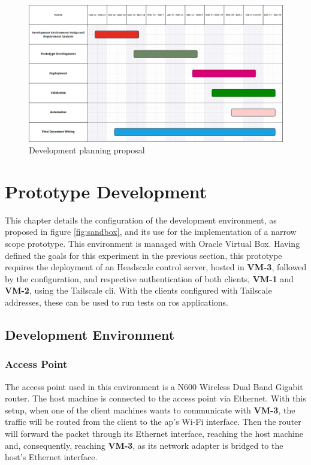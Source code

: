 \documentclass[11pt,twoside,a4paper]{report}
\begin{document}
\begin{figure}[h]
\centering
\includegraphics[width=1\textwidth]{gantt.png}
\caption{Development planning proposal}
\label{fig:gantt}
\end{figure}

\chapter{Prototype Development}

This chapter details the configuration of the development environment, as proposed in figure \ref{fig:sandbox}, and its use for the implementation of a narrow scope prototype. This environment is managed with Oracle Virtual Box. Having defined the goals for this experiment in the previous section, this prototype requires the deployment of an Headscale control server, hosted in \textbf{VM-3}, followed by the configuration, and respective authentication of both clients, \textbf{VM-1} and \textbf{VM-2}, using the Tailscale \ac{cli}. With the clients configured with Tailscale addresses, these can be used to run tests on \ac{ros} applications.

\section{Development Environment}

\subsection{Access Point}

The access point used in this environment is a N600 Wireless Dual Band Gigabit router. The host machine is connected to the access point via Ethernet. With this setup, when one of the client machines wants to communicate with \textbf{VM-3}, the traffic will be routed from the client to the \ac{ap}'s Wi-Fi interface. Then the router will forward the packet through its Ethernet interface, reaching the host machine and, consequently, reaching \textbf{VM-3}, as its network adapter is bridged to the host's Ethernet interface.
\end{document}
